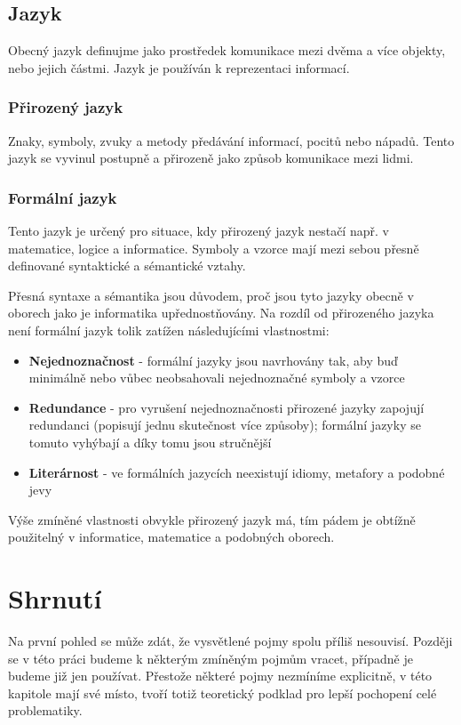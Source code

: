 \subsection{Jazyk} \label{sec:jazyk}
Obecný jazyk definujme jako prostředek komunikace mezi dvěma a více objekty, nebo jejich částmi. Jazyk je používán k reprezentaci informací.
\subsubsection*{Přirozený jazyk}
Znaky, symboly, zvuky a metody předávání informací, pocitů nebo nápadů.\cite{cite:05} Tento jazyk se vyvinul postupně a přirozeně jako způsob komunikace mezi lidmi.\cite{cite:07}  
\subsubsection*{Formální jazyk}
Tento jazyk je určený pro situace, kdy přirozený jazyk nestačí např. v matematice, logice a informatice. Symboly a vzorce mají mezi sebou přesně definované syntaktické a sémantické vztahy. \cite{cite:07}\par
Přesná syntaxe a sémantika jsou důvodem, proč jsou tyto jazyky obecně v oborech jako je informatika upřednostňovány. Na rozdíl od přirozeného jazyka není formální jazyk tolik zatížen následujícími vlastnostmi:
\begin{itemize}
\item \textbf{Nejednoznačnost} - formální jazyky jsou navrhovány tak, aby buď minimálně nebo vůbec neobsahovali nejednoznačné symboly a vzorce
\item \textbf{Redundance} - pro vyrušení nejednoznačnosti přirozené jazyky zapojují redundanci (popisují jednu skutečnost více způsoby); formální jazyky se tomuto vyhýbají a díky tomu jsou stručnější
\item \textbf{Literárnost} - ve formálních jazycích neexistují idiomy, metafory a podobné jevy \cite{cite:08}
\end{itemize}
Výše zmíněné vlastnosti obvykle přirozený jazyk má, tím pádem je obtížně použitelný v informatice, matematice a podobných oborech.
\section{Shrnutí}
Na první pohled se může zdát, že vysvětlené pojmy spolu příliš nesouvisí. Později se v této práci budeme k některým zmíněným pojmům vracet, případně je budeme již jen používat. Přestože některé pojmy nezmíníme explicitně, v této kapitole mají své místo, tvoří totiž teoretický podklad pro lepší pochopení celé problematiky.



